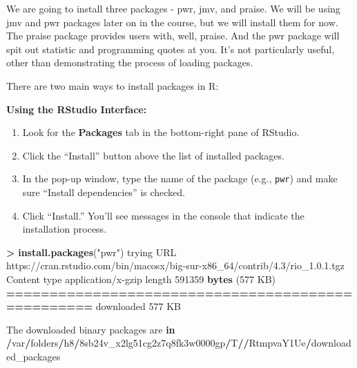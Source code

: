 \documentclass[
]{book}
\newenvironment{Shaded}{\begin{snugshade}}{\end{snugshade}}
\newcommand{\ControlFlowTok}[1]{\textcolor[rgb]{0.13,0.29,0.53}{\textbf{#1}}}
\newcommand{\DecValTok}[1]{\textcolor[rgb]{0.00,0.00,0.81}{#1}}
\newcommand{\ErrorTok}[1]{\textcolor[rgb]{0.64,0.00,0.00}{\textbf{#1}}}
\newcommand{\FunctionTok}[1]{\textcolor[rgb]{0.13,0.29,0.53}{\textbf{#1}}}
\newcommand{\NormalTok}[1]{#1}
\newcommand{\SpecialCharTok}[1]{\textcolor[rgb]{0.81,0.36,0.00}{\textbf{#1}}}
\newcommand{\StringTok}[1]{\textcolor[rgb]{0.31,0.60,0.02}{#1}}
\begin{document}
We are going to install three packages - pwr, jmv, and praise. We will be using jmv and pwr packages later on in the course, but we will install them for now. The praise package provides users with, well, praise. And the pwr package will spit out statistic and programming quotes at you. It's not particularly useful, other than demonstrating the process of loading packages.

There are two main ways to install packages in R:

\textbf{Using the RStudio Interface:}

\begin{enumerate}
\def\labelenumi{\arabic{enumi}.}
\item
  Look for the \textbf{Packages} tab in the bottom-right pane of RStudio.
\item
  Click the ``Install'' button above the list of installed packages.
\item
  In the pop-up window, type the name of the package (e.g., \texttt{pwr}) and make sure ``Install dependencies'' is checked.
\item
  Click ``Install.'' You'll see messages in the console that indicate the installation process.
\end{enumerate}

\begin{Shaded}
\begin{Highlighting}[]
\SpecialCharTok{\textgreater{}} \FunctionTok{install.packages}\NormalTok{(}\StringTok{"pwr"}\NormalTok{)}
\NormalTok{trying URL }\StringTok{\textquotesingle{}https://cran.rstudio.com/bin/macosx/big{-}sur{-}x86\_64/contrib/4.3/rio\_1.0.1.tgz\textquotesingle{}}
\NormalTok{Content type }\StringTok{\textquotesingle{}application/x{-}gzip\textquotesingle{}}\NormalTok{ length }\DecValTok{591359} \FunctionTok{bytes}\NormalTok{ (}\DecValTok{577}\NormalTok{ KB)}
\SpecialCharTok{==}\ErrorTok{================================================}
\NormalTok{downloaded }\DecValTok{577}\NormalTok{ KB}


\NormalTok{The downloaded binary packages are }\ControlFlowTok{in}
    \SpecialCharTok{/}\NormalTok{var}\SpecialCharTok{/}\NormalTok{folders}\SpecialCharTok{/}\NormalTok{h8}\SpecialCharTok{/}\DecValTok{8}\NormalTok{sb24v\_x2lg51cg2z7q8fk3w0000gp}\SpecialCharTok{/}\NormalTok{T}\SpecialCharTok{/}\ErrorTok{/}\NormalTok{RtmpvaY1Ue}\SpecialCharTok{/}\NormalTok{downloaded\_packages}
\end{Highlighting}
\end{Shaded}
\end{document}
